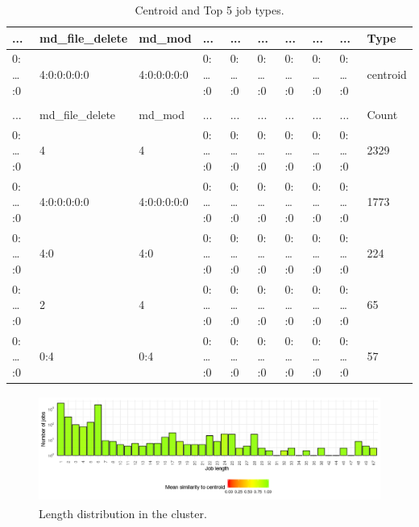 \documentclass[]{llncs}
\begin{document}
\begin{table}
  \centering
	\begin{tiny}
		\begin{tabular}{@{ }l@{ }@{ }l@{ }@{ }l@{ }@{ }l@{ }@{ }l@{ }@{ }l@{ }@{ }l@{ }@{ }l@{ }@{ }l@{ }@{ }l@{ }}
			...     & md\_file\_delete & md\_mod     & ...     & ...     & ...     & ...     & ...     & ...     & Type     \\ 
			\hline
			0: … :0 & 4:0:0:0:0:0      & 4:0:0:0:0:0 & 0: … :0 & 0: … :0 & 0: … :0 & 0: … :0 & 0: … :0 & 0: … :0 & centroid \\ 
			        &                  &             &         &         &         &         &         &         &          \\ 
			...     & md\_file\_delete & md\_mod     & ...     & ...     & ...     & ...     & ...     & ...     & Count    \\ 
			\hline
			0: … :0 & 4                & 4           & 0: … :0 & 0: … :0 & 0: … :0 & 0: … :0 & 0: … :0 & 0: … :0 & 2329     \\ 
			0: … :0 & 4:0:0:0:0:0      & 4:0:0:0:0:0 & 0: … :0 & 0: … :0 & 0: … :0 & 0: … :0 & 0: … :0 & 0: … :0 & 1773     \\ 
			0: … :0 & 4:0              & 4:0         & 0: … :0 & 0: … :0 & 0: … :0 & 0: … :0 & 0: … :0 & 0: … :0 & 224      \\ 
			0: … :0 & 2                & 4           & 0: … :0 & 0: … :0 & 0: … :0 & 0: … :0 & 0: … :0 & 0: … :0 & 65       \\ 
			0: … :0 & 0:4              & 0:4         & 0: … :0 & 0: … :0 & 0: … :0 & 0: … :0 & 0: … :0 & 0: … :0 & 57       \\ 
		\end{tabular}
	\end{tiny}
	\caption{Centroid and Top 5 job types.}
  \label{fig:pm_quant:top_jobs}
\end{table}

\begin{figure}
  \centering
  \includegraphics[width=4.61in,height=1.39in]{./media/image21.png}
  \caption{Length distribution in the cluster.}
  \label{fig:pm_quant:length}
\end{figure}
\end{document}
